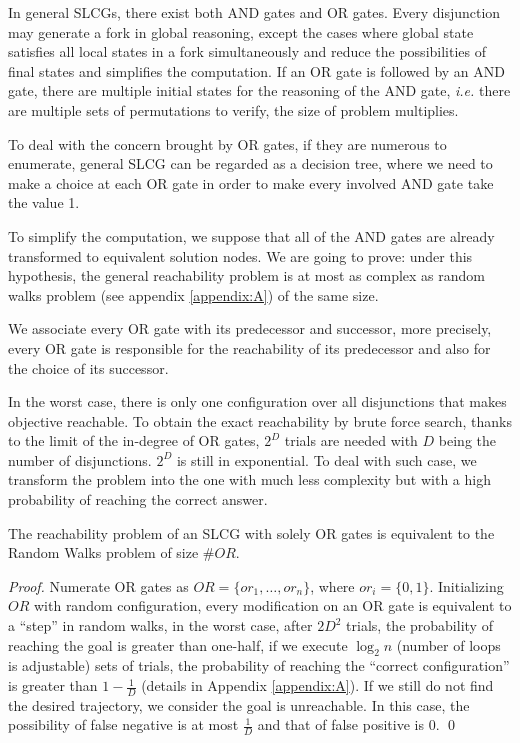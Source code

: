 \documentclass[runningheads]{llncs}
\begin{document}
In general SLCGs, there exist both AND gates and OR gates. Every disjunction may generate a fork in global reasoning, except the cases where global state satisfies all local states in a fork simultaneously and reduce the possibilities of final states and simplifies the computation. If an OR gate is followed by an AND gate, there are multiple initial states for the reasoning of the AND gate, \textit{i.e.} there are multiple sets of permutations to verify, the size of problem multiplies. 

To deal with the concern brought by OR gates, if they are numerous %
to enumerate, general SLCG can be regarded as a decision tree, where we need to make a choice at each OR gate in order to make every involved AND gate take the value 1. 

To simplify the computation, we suppose that all of the AND gates are already transformed to equivalent solution nodes. We are going to prove: under this hypothesis, the general reachability problem is at most as complex as random walks problem \cite{pearson1905problem} (see appendix \ref{appendix:A}) of the same size. 

We associate every OR gate with its predecessor and successor, more precisely, every OR gate is responsible for the reachability of its predecessor and also for the choice of its successor.

In the worst case, there is only one configuration over all disjunctions that makes objective reachable. To obtain the exact reachability by brute force search, thanks to the limit of the in-degree of OR gates, $2^D$ trials are needed with $D$ being the number of disjunctions. $2^D$ is still in exponential. To deal with such case, we transform the problem into the one with much less complexity but with a high probability of reaching the correct answer. 
\begin{theorem}\label{TheoEquiv}
The reachability problem of an SLCG with solely OR gates is equivalent to the Random Walks problem of size $\#OR$.
\end{theorem}
\begin{proof}
Numerate OR gates as $OR=\{or_1,\ldots, or_n\}$, where $or_i=\{0,1\}$. Initializing $OR$ with random configuration, every modification on an OR gate is equivalent to a ``step'' in random walks, in the worst case, after $2D^2$ trials, the probability of reaching the goal is greater than one-half, if we execute $\log_2 n$ (number of loops is adjustable) sets of trials, the probability of reaching the ``correct configuration'' is greater than $1-\frac{1}{D}$ (details in Appendix \ref{appendix:A}). If we still do not find the desired trajectory, we consider the goal is unreachable. In this case, the possibility of false negative is at most $\frac{1}{D}$ and that of false positive is $0$.
\qed\end{proof}
\end{document}
